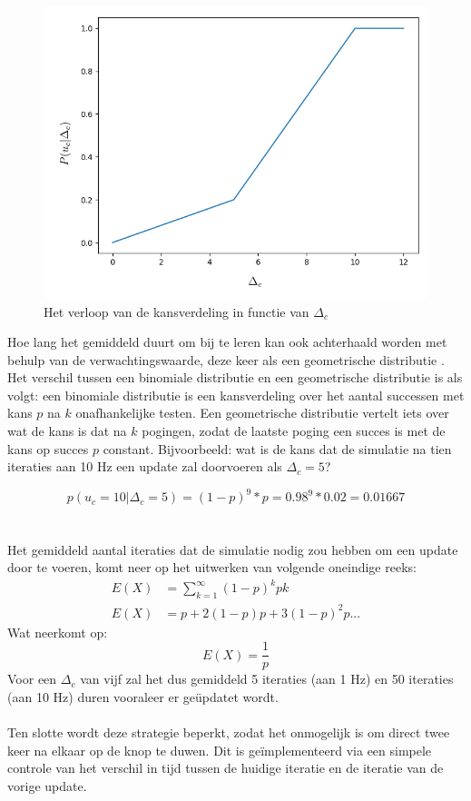 \begin{figure}[h]
  \centering
  \includegraphics[width=\linewidth]{images/stochastische_kans_cadansupdate.png}
  \caption{Het verloop van de kansverdeling in functie van $\Delta_c$}
  \label{fig:kansverdeling cadansupdate}
\end{figure}

\noindent Hoe lang het gemiddeld duurt om bij te leren kan ook achterhaald worden met behulp van de verwachtingswaarde, deze keer als een geometrische distributie \cite{geometric wiki}. Het verschil tussen een binomiale distributie en een geometrische distributie is als volgt: een binomiale distributie is een kansverdeling over het aantal successen met kans $p$ na $k$ onafhankelijke testen. Een geometrische distributie vertelt iets over wat de kans is dat na $k$ pogingen, zodat de laatste poging een succes is met de kans op succes $p$ constant. Bijvoorbeeld: wat is de kans dat de simulatie na tien iteraties aan 10 Hz een update zal doorvoeren als $\Delta_c=5$?

\[p(u_c=10|\Delta_c=5)=(1-p)^9*p=0.98^9*0.02=0.01667\]
\\\\
\noindent Het gemiddeld aantal iteraties dat de simulatie nodig zou hebben om een update door te voeren, komt neer op het uitwerken van volgende oneindige reeks:
\begin{align*}
E(X)&=\sum_{k=1}^{\infty} (1-p)^kpk \\
E(X)&=p+2(1-p)p+3(1-p)^2 p...
\end{align*}
Wat neerkomt op:
\[E(X)=\frac{1}{p}\]
Voor een $\Delta_c$ van vijf zal het dus gemiddeld 5 iteraties (aan 1 Hz) en 50 iteraties (aan 10 Hz) duren vooraleer er geüpdatet wordt.
\\\\
Ten slotte wordt deze strategie beperkt, zodat het onmogelijk is om direct twee keer na elkaar op de knop te duwen. Dit is geïmplementeerd via een simpele controle van het verschil in tijd tussen de huidige iteratie en de iteratie van de vorige update.

